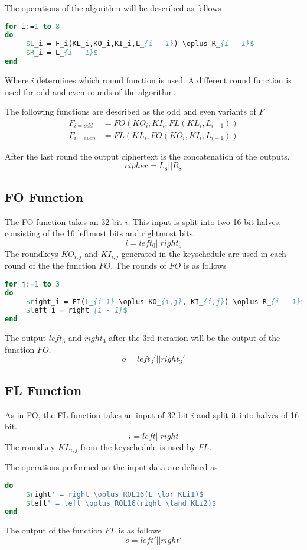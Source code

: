 The operations of the algorithm will be described as follows

\begin{lstlisting}[frame=single, language=Pascal, mathescape,
captionpos=b, caption={Pseudo code for KASUMI alogrithm}]
for i:=1 to 8
do
     $L_i = F_i(KL_i,KO_i,KI_i,L_{i - 1}) \oplus R_{i - 1}$
     $R_i = L_{i - 1}$
end
\end{lstlisting}

Where $i$ determines which round function is used. A different round
function is used for odd and even rounds of the algorithm.

The following functions are described as the odd and even variants of $F$
\begin{align*}
  F_{i = odd} &= FO(KO_i, KI_i, FL(KL_i, L_{i - 1}))\\
  F_{i = even} &= FL(KL_i, FO(KO_i,KI_i, L_{i - 1}))
\end{align*}

After the last round the output ciphertext is the concatenation of the
outputs.
\[cipher = L_8 || R_8\]

\subsection{FO Function}
The FO function takes an 32-bit $i$. This input is split into two
16-bit halves, consisting of the 16 leftmost bits and rightmost bits.
\[i = left_0 || right_o\]
The roundkeys $KO_{i,j}$ and $KI_{i,j}$ generated in the keyschedule
are used in each round of the the function $FO$.
The rounds of $FO$ is as follows
\begin{lstlisting}[frame=single, language=Pascal, mathescape,
captionpos=b, caption={Pseudo code for $FO$ function}]
for j:=1 to 3
do
     $right_i = FI(L_{i-1} \oplus KO_{i,j}, KI_{i,j}) \oplus R_{i - 1}$
     $left_i = right_{i - 1}$
end
\end{lstlisting}
The output $left_3$ and $right_3$ after the $3$rd iteration will be
the output of the function $FO$.
\[o = left_3' || right_3'\]
\subsection{FL Function}
As in FO, the FL function takes an input of 32-bit $i$ and split it into
halves of 16-bit.
\[i = left || right\]
The roundkey $KL_{i,j}$ from the keyschedule is used by $FL$.

The operations performed on the input data are defined as
\begin{lstlisting}[frame=single, language=Pascal, mathescape,captionpos=b, caption={Pseudo code for $FL$ function}]
do
     $right' = right \oplus ROL16(L \lor KLi1)$
     $left' = left \oplus ROL16(right \land KLi2)$
end
\end{lstlisting}
The output of the function $FL$ is as follows
\[o = left' || right'\]
